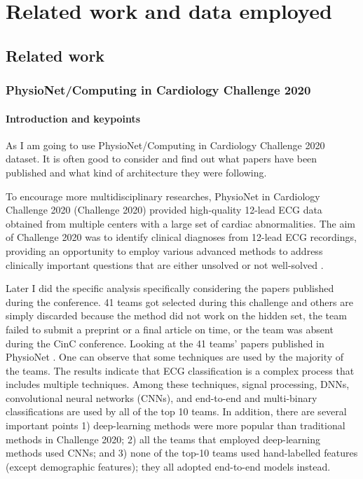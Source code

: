 \chapter{Related work and data employed} \label{chap3}

\section{Related work} \label{3relatedwork}

\subsection{PhysioNet/Computing in Cardiology Challenge 2020}

\subsubsection{Introduction and keypoints}

As I am going to use \cite{physionet_challenge_2020} PhysioNet/Computing in Cardiology Challenge 2020 dataset. It is often good to consider and find out what papers have been published and what kind of architecture they were following. 

\cite{main_arythmia_detection}To encourage more multidisciplinary researches, PhysioNet in Cardiology Challenge 2020 (Challenge 2020) \cite{physionet_challenge_2020} provided high-quality 12-lead ECG data obtained from multiple centers with a large set of cardiac abnormalities. The aim of Challenge 2020 was to identify clinical diagnoses from 12-lead ECG recordings, providing an opportunity to employ various advanced methods to address clinically important questions that are either unsolved or not well-solved \cite{arythmia_detection_9}.

Later I did the specific analysis specifically considering the papers published during the conference. 41 teams got selected during this challenge and others are simply discarded because the method did not work on the hidden set, the team failed to submit a preprint or a final article on time, or the team was absent during the CinC conference. Looking at the 41 teams' papers published in PhysioNet \cite{physionet_challenge_2020}. One can observe that some techniques are used by the majority of the teams. The results indicate that ECG classification is a complex process that includes multiple techniques. Among these techniques, signal processing, DNNs, convolutional neural networks (CNNs), and end-to-end and multi-binary classifications are used by all of the top 10 teams. In addition, there are several important points 1) deep-learning methods were more popular than traditional methods in Challenge 2020; 2) all the teams that employed deep-learning methods used CNNs; and 3) none of the top-10 teams used hand-labelled features (except demographic features); they all adopted end-to-end models instead. 

